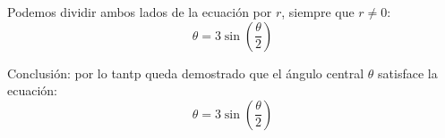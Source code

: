  Podemos dividir ambos lados de la ecuación por \( r \), siempre que \( r \neq 0 \):
   \begin{equation}
       \theta = 3 \sin\left(\frac{\theta}{2}\right)
   \end{equation}

 Conclusión: por lo tantp queda demostrado que el ángulo central \( \theta \) satisface la ecuación:
   \[
   \theta = 3 \sin\left(\frac{\theta}{2}\right)
   \]


    
